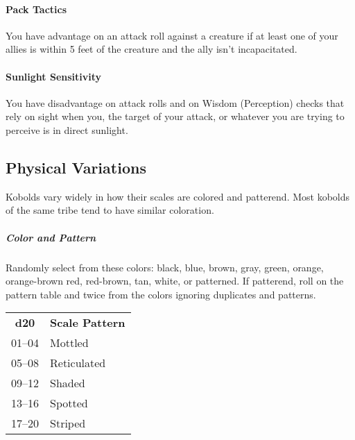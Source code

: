 \documentclass{dm}
\begin{document}
\begin{cols}
    \paragraph{Pack Tactics}
    You have advantage on an attack roll against a creature if at least one of your allies is within 5 feet of the creature and the ally isn't incapacitated.

    \paragraph{Sunlight Sensitivity}
    You have disadvantage on attack rolls and on Wisdom (Perception) checks that rely on sight when you, the target of your attack, or whatever you are trying to perceive is in direct sunlight.

    \subsection{Physical Variations}
    Kobolds vary widely in how their scales are colored and patterend.
    Most kobolds of the same tribe tend to have similar coloration.

    \subparagraph{Color and Pattern}
    Randomly select from these colors: black, blue, brown, gray, green, orange, orange-brown red, red-brown, tan, white, or patterned.
    If patterend, roll on the pattern table and twice from the colors ignoring duplicates and patterns.

    \begin{tabularz}
      \begin{tabularx}{\linewidth}{cX}
        \textbf{d20}  & \textbf{Scale Pattern} \\
        01--04 & Mottled\\
        05--08 & Reticulated \\
        09--12 & Shaded \\
        13--16 & Spotted \\
        17--20 & Striped \\
      \end{tabularx}
    \end{tabularz}

  \end{cols}
\end{document}
